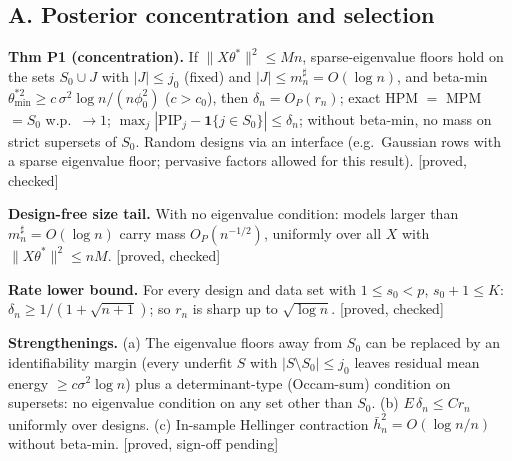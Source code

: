\documentclass[10pt]{article}
\newcommand{\st}[1]{\textsf{\small[#1]}}
\begin{document}
\subsection*{A. Posterior concentration and selection}
\textbf{Thm P1 (concentration).} If $\|X\theta^*\|^2\le Mn$, sparse-eigenvalue floors hold on the sets $S_0\cup J$ with $|J|\le j_0$ (fixed) and $|J|\le m^\sharp_n=O(\log n)$, and beta-min $\theta^{*2}_{\min}\ge c\,\sigma^2\log n/(n\phi_0^2)$ ($c>c_0$), then
$\delta_n=O_P(r_n)$; exact HPM $=$ MPM $=S_0$ w.p.\ $\to1$; $\max_j|\mathrm{PIP}_j-\mathbf 1\{j\in S_0\}|\le\delta_n$; without beta-min, no mass on strict supersets of $S_0$. Random designs via an interface (e.g.\ Gaussian rows with a sparse eigenvalue floor; pervasive factors allowed for this result).
\st{proved, checked}

\textbf{Design-free size tail.} With no eigenvalue condition: models larger than $m^\sharp_n=O(\log n)$ carry mass $O_P(n^{-1/2})$, uniformly over all $X$ with $\|X\theta^*\|^2\le nM$. \st{proved, checked}

\textbf{Rate lower bound.} For every design and data set with $1\le s_0<p$, $s_0+1\le K$: $\delta_n\ge 1/(1+\sqrt{n+1})$; so $r_n$ is sharp up to $\sqrt{\log n}$.
\st{proved, checked}

\textbf{Strengthenings.} (a) The eigenvalue floors away from $S_0$ can be replaced by an identifiability margin (every underfit $S$ with $|S\setminus S_0|\le j_0$ leaves residual mean energy $\ge c\sigma^2\log n$) plus a determinant-type (Occam-sum) condition on supersets: no eigenvalue condition on any set other than $S_0$.
(b) $E\,\delta_n\le C r_n$ uniformly over designs. (c) In-sample Hellinger contraction $\bar h_n^2=O(\log n/n)$ without beta-min.
\st{proved, sign-off pending}
\end{document}
